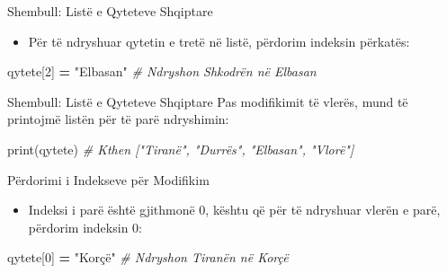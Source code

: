 \documentclass[
  ignorenonframetext,
]{beamer}
\newenvironment{Shaded}{\begin{snugshade}}{\end{snugshade}}
\newcommand{\BuiltInTok}[1]{#1}
\newcommand{\CommentTok}[1]{\textcolor[rgb]{0.56,0.35,0.01}{\textit{#1}}}
\newcommand{\DecValTok}[1]{\textcolor[rgb]{0.00,0.00,0.81}{#1}}
\newcommand{\NormalTok}[1]{#1}
\newcommand{\OperatorTok}[1]{\textcolor[rgb]{0.81,0.36,0.00}{\textbf{#1}}}
\newcommand{\StringTok}[1]{\textcolor[rgb]{0.31,0.60,0.02}{#1}}
\providecommand{\tightlist}{%
  \setlength{\itemsep}{0pt}\setlength{\parskip}{0pt}}
\begin{document}
\begin{frame}[fragile]{Shembull: Listë e Qyteteve Shqiptare}
\protect\hypertarget{shembull-listuxeb-e-qyteteve-shqiptare-1}{}
\begin{itemize}
\tightlist
\item
  Për të ndryshuar qytetin e tretë në listë, përdorim indeksin përkatës:
\end{itemize}

\begin{Shaded}
\begin{Highlighting}[]
\NormalTok{qytete[}\DecValTok{2}\NormalTok{] }\OperatorTok{=} \StringTok{"Elbasan"}  \CommentTok{\# Ndryshon Shkodrën në Elbasan}
\end{Highlighting}
\end{Shaded}
\end{frame}

\begin{frame}[fragile]{Shembull: Listë e Qyteteve Shqiptare}
\protect\hypertarget{shembull-listuxeb-e-qyteteve-shqiptare-2}{}
Pas modifikimit të vlerës, mund të printojmë listën për të parë
ndryshimin:

\begin{Shaded}
\begin{Highlighting}[]
\BuiltInTok{print}\NormalTok{(qytete)  }\CommentTok{\# Kthen ["Tiranë", "Durrës", "Elbasan", "Vlorë"]}
\end{Highlighting}
\end{Shaded}
\end{frame}

\begin{frame}[fragile]{Përdorimi i Indekseve për Modifikim}
\protect\hypertarget{puxebrdorimi-i-indekseve-puxebr-modifikim}{}
\begin{itemize}
\tightlist
\item
  Indeksi i parë është gjithmonë 0, kështu që për të ndryshuar vlerën e
  parë, përdorim indeksin 0:
\end{itemize}

\begin{Shaded}
\begin{Highlighting}[]
\NormalTok{qytete[}\DecValTok{0}\NormalTok{] }\OperatorTok{=} \StringTok{"Korçë"}  \CommentTok{\# Ndryshon Tiranën në Korçë}
\end{Highlighting}
\end{Shaded}
\end{frame}
\end{document}
